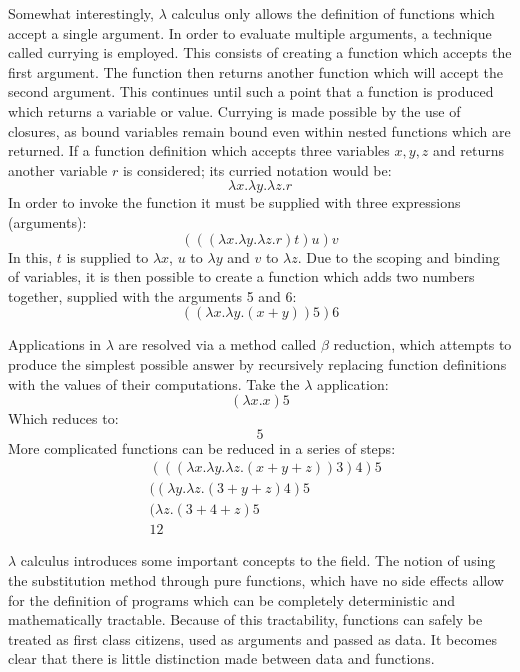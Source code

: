 \documentclass[12pt,a4paper]{article}
\begin{document}
Somewhat interestingly, $\lambda$ calculus only allows the definition of functions which accept a single argument. In order to evaluate multiple arguments, a technique called currying is employed. This consists of creating a function which accepts the first argument. The function then returns another function which will accept the second argument. This continues until such a point that a function is produced which returns a variable or value. Currying is made possible by the use of closures, as bound variables remain bound even within nested functions which are returned. If a function definition which accepts three variables $x,y,z$ and returns another variable $r$ is considered; its curried notation would be:
\begin{displaymath}
    \lambda x. \lambda y. \lambda z.r
\end{displaymath}
In order to invoke the function it must be supplied with three expressions (arguments):
\begin{displaymath}
    (((\lambda x. \lambda y. \lambda z.r) t ) u ) v
\end{displaymath}
In this, $t$ is supplied to $\lambda x$, $u$ to $\lambda y$ and $v$ to $\lambda z$. Due to the scoping and binding of variables, it is then possible to create a function which adds two numbers together, supplied with the arguments 5 and 6:
\begin{displaymath}
    ((\lambda x. \lambda y.(x+y) ) 5 ) 6
\end{displaymath}

Applications in $\lambda$ are resolved via a method called $\beta$ reduction, which attempts to produce the simplest possible answer by recursively replacing function definitions with the values of their computations. Take the $\lambda$ application:
\begin{displaymath}
    (\lambda x.x)5
\end{displaymath}
Which reduces to:
\begin{displaymath}
    5
\end{displaymath}
More complicated functions can be reduced in a series of steps:
\begin{align*}
    & (((\lambda x. \lambda y. \lambda z.(x + y + z))3)4)5 \\
    & ((\lambda y. \lambda z.(3  + y + z)4)5 \\
    & (\lambda z.(3 + 4 + z)5 \\
    & 12
\end{align*}

$\lambda$ calculus introduces some important concepts to the field. The notion of using the substitution method through pure functions, which have no side effects allow for the definition of programs which can be completely deterministic and mathematically tractable. Because of this tractability, functions can safely be treated as first class citizens, used as arguments and passed as data. It becomes clear that there is little distinction made between data and functions. 
\end{document}
